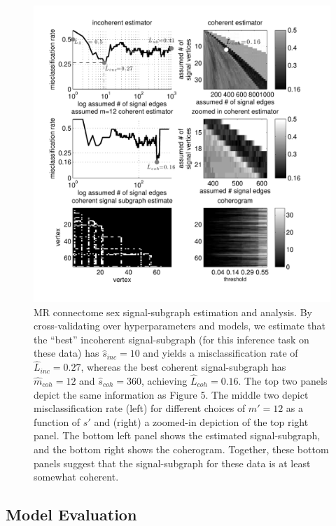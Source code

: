 \documentclass[10pt,journal,cspaper,compsoc]{IEEEtran}
\providecommand{\wh}[1]{\widehat{#1}}
\begin{document}
\begin{figure}[htbp]
	\centering
		\includegraphics[width=1.0\linewidth]{../figs/BLSA0317_Count_Lhats_results.pdf}
	\caption{MR connectome sex signal-subgraph estimation and analysis. By cross-validating over hyperparameters and models, we estimate that the ``best'' incoherent signal-subgraph (for this inference task on these data) has $\wh{s}_{inc}=10$ and yields a misclassification rate of $\wh{L}_{inc}=0.27$, whereas the best coherent signal-subgraph has $\wh{m}_{coh}=12$ and $\wh{s}_{coh}=360$, achieving $\wh{L}_{coh}=0.16$.  The top two panels depict the same information as Figure 5.  The middle two depict misclassification rate (left) for different choices of $m'=12$ as a function of $s'$ and (right) a zoomed-in depiction of the top right panel. The bottom left panel shows the estimated signal-subgraph, and the bottom right shows the coherogram.  Together, these bottom panels suggest that the signal-subgraph for these data is at least somewhat coherent.}
	\label{fig:data}
\end{figure}




\subsection{Model Evaluation} %
\label{sub:model_checking}
\end{document}
